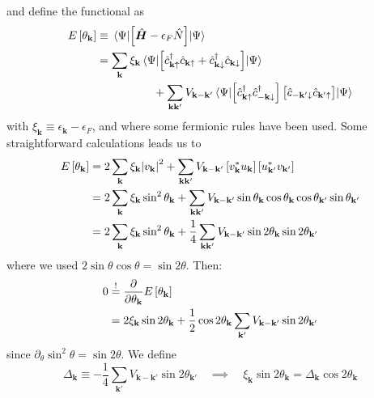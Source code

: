 and define the functional as
\[
\begin{aligned}
	E\left[{\theta_\mathbf{k}}\right] &\equiv \mel{\Psi}{\left[{\hat{\bm H} - \epsilon_F \hat{N}}\right]}{\Psi} \\
	&= \sum_{\mathbf{k}} \xi_{\mathbf{k}} \mel{\Psi}{\left[{\hat{c}_{\mathbf{k}\uparrow}^\dagger \hat{c}_{\mathbf{k}\uparrow} + \hat{c}_{\mathbf{k}\downarrow}^\dagger \hat{c}_{\mathbf{k}\downarrow}}\right]}{\Psi} \\ 
	&\hspace{5em} + \sum_{\mathbf{k}\mathbf{k}'} V_{\mathbf{k}-\mathbf{k}'} \mel{\Psi}{\left[{\hat{c}_{\mathbf{k}\uparrow}^\dagger \hat{c}_{-\mathbf{k}\downarrow}^\dagger}\right] \left[{\vphantom{c^\dagger} \hat{c}_{-\mathbf{k}'\downarrow} \hat{c}_{\mathbf{k}'\uparrow}}\right]}{\Psi}
\end{aligned}
\]
with $\xi_{\mathbf{k}} \equiv \epsilon_{\mathbf{k}} - \epsilon_F$, and where some fermionic rules have been used. Some straightforward calculations leads us to
\[
\begin{aligned}
	E\left[{\theta_\mathbf{k}}\right] &= 2 \sum_{\mathbf{k}} \xi_{\mathbf{k}} \abs{v_\mathbf{k}}^2 + \sum_{\mathbf{k}\mathbf{k}'} V_{\mathbf{k}-\mathbf{k}'} \left[{v_\mathbf{k}^* u_\mathbf{k}}\right] \left[{u_{\mathbf{k}'}^* v_{\mathbf{k}'}}\right] \\
	&= 2 \sum_{\mathbf{k}} \xi_{\mathbf{k}} \sin^2\theta_\mathbf{k} + \sum_{\mathbf{k}\mathbf{k}'} V_{\mathbf{k}-\mathbf{k}'}
	\sin\theta_\mathbf{k} \cos\theta_\mathbf{k}
	\cos\theta_{\mathbf{k}'} \sin\theta_{\mathbf{k}'} \\
	&= 2 \sum_{\mathbf{k}} \xi_{\mathbf{k}} \sin^2\theta_\mathbf{k} + \frac{1}{4} \sum_{\mathbf{k}\mathbf{k}'} V_{\mathbf{k}-\mathbf{k}'}
	\sin2\theta_\mathbf{k} \sin2\theta_{\mathbf{k}'}
\end{aligned}
\]
where we used $2 \sin\theta\cos\theta = \sin2\theta$.
Then:
\[
\begin{aligned}
	0 &\stackrel{!}{=} \pdv{}{\theta_\mathbf{k}} E\left[{\theta_\mathbf{k}}\right] \\
	&= 2 \xi_\mathbf{k} \sin2\theta_\mathbf{k} + \frac{1}{2} 
	\cos2\theta_\mathbf{k} \sum_{\mathbf{k}'} V_{\mathbf{k}-\mathbf{k}'} \sin2\theta_{\mathbf{k}'} 
\end{aligned}
\]
since $\partial_\theta \sin^2 \theta = \sin2\theta$. We define
\begin{equation}\label{eq:delta variational definition}
	\Delta_\mathbf{k} \equiv - \frac{1}{4} 
	\sum_{\mathbf{k}'} V_{\mathbf{k}-\mathbf{k}'} \sin2\theta_{\mathbf{k}'}
	\quad\implies\quad
	\xi_\mathbf{k} \sin2\theta_\mathbf{k} = \Delta_\mathbf{k} \cos2\theta_\mathbf{k}
\end{equation}
